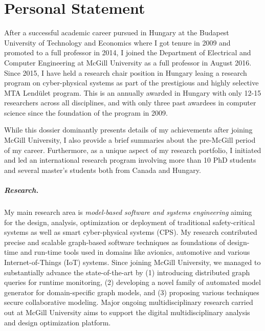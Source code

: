 \chapter{Personal Statement}
\label{sec:personal-statement}

After a successful academic career pursued in Hungary at the Budapest University of Technology and Economics where I got tenure in 2009 and promoted to a full professor in 2014, I joined the Department of Electrical and Computer Engineering at McGill University as a full professor in August 2016. Since 2015, I have held a research chair position in Hungary leaing a research program on cyber-physical systems as part of the prestigious and highly selective MTA Lendület program. 
This is an annually awarded in Hungary with only 12-15 researchers across all disciplines, and with only three past awardees in computer science since the foundation of the program in 2009. 

While this dossier dominantly presents details of my achievements after joining McGill University, I also provide a brief summaries about the pre-McGill period of my career. Furthermore, as a unique aspect of my research portfolio, I initiated and led an international research program involving more than 10 PhD students and several master's students both from Canada and Hungary.

\paragraph{Research.}
My main research area is \emph{model-based software and systems engineering} aiming for the design, analysis, optimization or deployment of traditional safety-critical systems as well as smart cyber-physical systems (CPS). My research contributed precise and scalable graph-based software techniques as foundations of design-time and run-time tools used in domains like avionics, automotive and various Internet-of-Things (IoT) systems. Since joining McGill University, we managed to substantially advance the state-of-the-art by (1) introducing distributed graph queries for runtime monitoring, (2) developing a novel family of automated model generator for domain-specific graph models, and (3) proposing various techniques secure collaborative modeling. Major ongoing multidisciplinary research carried out at McGill University aims to support the digital multidisciplinary analysis and design optimization platform.

